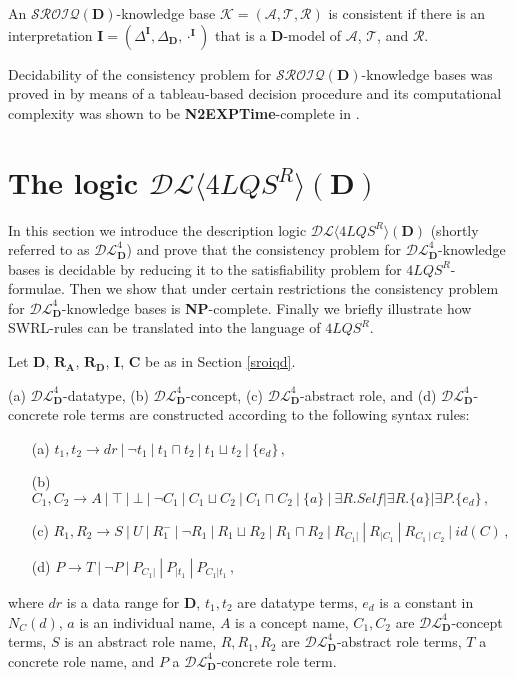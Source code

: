 \documentclass[a4paper]{llncs}
\newcommand{\dlss}{\mathcal{DL}\langle 4LQS^R\rangle(\D)}
\newcommand{\shdlss}{\mathcal{DL}_{\D}^{4}}
\newcommand{\sroiqd}{\ensuremath{\mathcal{SROIQ}(\D)}}
\newcommand{\flqsr}{\ensuremath{4LQS^R}}
\newcommand{\I}{\mathbf{I}}
\newcommand{\C}{\mathbf{C}}
\newcommand{\D}{\mathbf{D}}
\newcommand{\Ra}{\mathbf{R_A}}
\newcommand{\Rd}{\mathbf{R_D}}
\begin{document}
An \sroiqd-knowledge base $\mathcal{K}=(\mathcal{A}, \mathcal{T}, \mathcal{R})$ is consistent if there is an interpretation $\I= (\Delta^ \I, \Delta_{\D}, \cdot^\I)$ that is a $\D$-model of $\mathcal{A}$,  $\mathcal{T}$, and $\mathcal{R}$.

Decidability of the consistency problem for \sroiqd-knowledge bases was proved in \cite{Horrocks2006} by means of a tableau-based decision procedure and its computational complexity was shown to be \textbf{N2EXPTime}-complete in \cite{Kazakov:08:RIQ:SROIQ}.



\section{The logic $\dlss$}\label{dlss}
In this section we introduce the description logic $\dlss$ (shortly referred to as $\shdlss$) and prove that the consistency problem for $\shdlss$-knowledge bases is decidable by reducing it to the satisfiability problem for $\flqsr$-formulae. Then we show that under certain restrictions the consistency problem for $\shdlss$-knowledge bases is \textbf{NP}-complete. Finally we briefly illustrate how SWRL-rules can be translated into the language of $\flqsr$.

Let $\D$, $\Ra$, $\Rd$, $\I$, $\C$ be as in Section \ref{sroiqd}.


\noindent
(a) $\shdlss$-datatype, (b) $\shdlss$-concept, (c) $\shdlss$-abstract role, and (d) $\shdlss$-concrete role terms are constructed according to the following syntax rules:
\begin{itemize}
\item[(a)] $t_1, t_2 \longrightarrow dr ~|~\neg t_1 ~|~t_1 \sqcap t_2 ~|~t_1 \sqcup t_2 ~|~\{e_{d}\}\, ,$

\item[(b)] $C_1, C_ 2 \longrightarrow A ~|~\top ~|~\bot ~|~\neg C_1 ~|~C_1 \sqcup C_2 ~|~C_1 \sqcap C_2 ~|~\{a\} ~|~\exists R.\mathit{Self}| \exists R.\{a\}| \exists P.\{e_{d}\}\, ,$

\item[(c)] $R_1, R_2 \longrightarrow S ~|~U ~|~R_1^{-} ~|~ \neg R_1 ~|~R_1 \sqcup R_2 ~|~R_1 \sqcap R_2 ~|~R_{C_1 |} ~|~R_{|C_1} ~|~R_{C_1 ~|~C_2} ~|~id(C)\, ,$

\item[(d)] $P \longrightarrow T ~|~\neg P ~|~P_{C_1 |} ~|~P_{|t_1} ~|~P_{C_1 | t_1}\, ,$
\end{itemize}
where $dr$ is a data range for $\D$, $t_1,t_2$ are datatype terms, $e_{d}$ is a constant in $N_{C}(d)$, $a$ is an individual name, $A$ is a concept name, $C_1, C_2$ are $\shdlss$-concept terms, $S$ is an abstract role name, $R, R_1,R_2$ are $\shdlss$-abstract role terms, $T$ a concrete role name, and $P$ a $\shdlss$-concrete role term.
\end{document}
